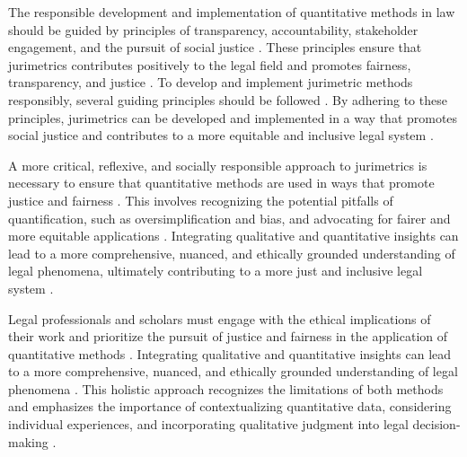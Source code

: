 The responsible development and implementation of quantitative methods in law should be guided by principles of transparency, accountability, stakeholder engagement, and the pursuit of social justice \cite{10.1007/s11186-021-09453-1,international2015}. These principles ensure that jurimetrics contributes positively to the legal field and promotes fairness, transparency, and justice \cite{10.1007/s11186-021-09453-1,international2015}. To develop and implement jurimetric methods responsibly, several guiding principles should be followed \cite{10.1007/s11186-021-09453-1,international2015}. By adhering to these principles, jurimetrics can be developed and implemented in a way that promotes social justice and contributes to a more equitable and inclusive legal system \cite{unger2021process}.

A more critical, reflexive, and socially responsible approach to jurimetrics is necessary to ensure that quantitative methods are used in ways that promote justice and fairness \cite{10.1590/dados.2022.65.3.267,1023071190721}. This involves recognizing the potential pitfalls of quantification, such as oversimplification and bias, and advocating for fairer and more equitable applications \cite{10.1590/dados.2022.65.3.267,1023071190721}. Integrating qualitative and quantitative insights can lead to a more comprehensive, nuanced, and ethically grounded understanding of legal phenomena, ultimately contributing to a more just and inclusive legal system \cite{10.1590/dados.2022.65.3.267,1023071190721}.

Legal professionals and scholars must engage with the ethical implications of their work and prioritize the pursuit of justice and fairness in the application of quantitative methods \cite{10.1007/s11186-021-09453-1,10.3390/fi9040068}. Integrating qualitative and quantitative insights can lead to a more comprehensive, nuanced, and ethically grounded understanding of legal phenomena \cite{10.1007/s11186-021-09453-1,10.3390/fi9040068}. This holistic approach recognizes the limitations of both methods and emphasizes the importance of contextualizing quantitative data, considering individual experiences, and incorporating qualitative judgment into legal decision-making \cite{10.1007/s11186-021-09453-1,10.3390/fi9040068}.

